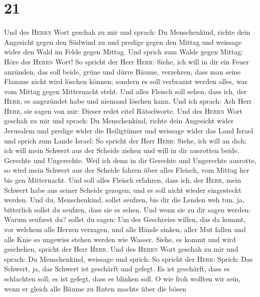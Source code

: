 \hypertarget{section-20}{%
\section{21}\label{section-20}}

 Und des \textsc{Herrn} Wort geschah zu mir und sprach:
 Du Menschenkind, richte dein Angesicht gegen den Südwind
zu und predige gegen den Mittag und weissage wider den Wald im Felde
gegen Mittag.  Und sprich zum Walde gegen Mittag: Höre des
\textsc{Herrn} Wort! So spricht der Herr \textsc{Herr}: Siehe, ich will
in dir ein Feuer anzünden, das soll beide, grüne und dürre Bäume,
verzehren, dass man seine Flamme nicht wird löschen können; sondern es
soll verbrannt werden alles, was vom Mittag gegen Mitternacht steht.
 Und alles Fleisch soll sehen, dass ich, der
\textsc{Herr}, es angezündet habe und niemand löschen kann.
 Und ich sprach: Ach Herr \textsc{Herr}, sie sagen von
mir: Dieser redet eitel Rätselworte.  Und des
\textsc{Herrn} Wort geschah zu mir und sprach:  Du
Menschenkind, richte dein Angesicht wider Jerusalem und predige wider
die Heiligtümer und weissage wider das Land Israel  und
sprich zum Lande Israel: So spricht der Herr \textsc{Herr}: Siehe, ich
will an dich; ich will mein Schwert aus der Scheide ziehen und will in
dir ausrotten beide, Gerechte und Ungerechte.  Weil ich
denn in dir Gerechte und Ungerechte ausrotte, so wird mein Schwert aus
der Scheide fahren über alles Fleisch, vom Mittag her bis gen
Mitternacht.  Und soll alles Fleisch erfahren, dass ich,
der \textsc{Herr}, mein Schwert habe aus seiner Scheide gezogen; und es
soll nicht wieder eingesteckt werden.  Und du,
Menschenkind, sollst seufzen, bis dir die Lenden weh tun, ja, bitterlich
sollst du seufzen, dass sie es sehen.  Und wenn sie zu
dir sagen werden: Warum seufzest du? sollst du sagen: Um des Geschreies
willen, das da kommt, vor welchem alle Herzen verzagen, und alle Hände
sinken, aller Mut fallen und alle Knie so ungewiss stehen werden wie
Wasser. Siehe, es kommt und wird geschehen, spricht der Herr
\textsc{Herr}.  Und des \textsc{Herrn} Wort geschah zu
mir und sprach:  Du Menschenkind, weissage und sprich: So
spricht der \textsc{Herr}: Sprich: Das Schwert, ja, das Schwert ist
geschärft und gefegt.  Es ist geschärft, dass es
schlachten soll; es ist gefegt, dass es blinken soll. O wie froh wollten
wir sein, wenn er gleich alle Bäume zu Ruten machte über die bösen
